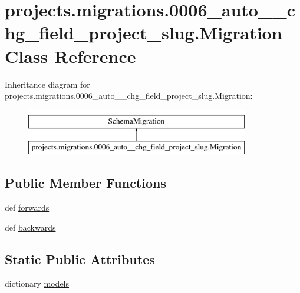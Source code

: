 \hypertarget{classprojects_1_1migrations_1_10006__auto____chg__field__project__slug_1_1_migration}{\section{projects.\-migrations.0006\-\_\-auto\-\_\-\-\_\-chg\-\_\-field\-\_\-project\-\_\-slug.Migration Class Reference}
\label{classprojects_1_1migrations_1_10006__auto____chg__field__project__slug_1_1_migration}
}
Inheritance diagram for projects.\-migrations.0006\-\_\-auto\-\_\-\-\_\-chg\-\_\-field\-\_\-project\-\_\-slug.Migration\-:\begin{figure}[H]
\begin{center}
\leavevmode
\includegraphics[height=2.000000cm]{classprojects_1_1migrations_1_10006__auto____chg__field__project__slug_1_1_migration}
\end{center}
\end{figure}
\subsection*{Public Member Functions}
\begin{DoxyCompactItemize}
\item 
def \hyperlink{classprojects_1_1migrations_1_10006__auto____chg__field__project__slug_1_1_migration_a9b08dce1497d22b3a0b217da247e7019}{forwards}
\item 
def \hyperlink{classprojects_1_1migrations_1_10006__auto____chg__field__project__slug_1_1_migration_a16c447f738cfac66fee9faae25c6c321}{backwards}
\end{DoxyCompactItemize}
\subsection*{Static Public Attributes}
\begin{DoxyCompactItemize}
\item 
dictionary \hyperlink{classprojects_1_1migrations_1_10006__auto____chg__field__project__slug_1_1_migration_ac062189ac058281c8d98f29ee61e3733}{models}
\end{DoxyCompactItemize}


